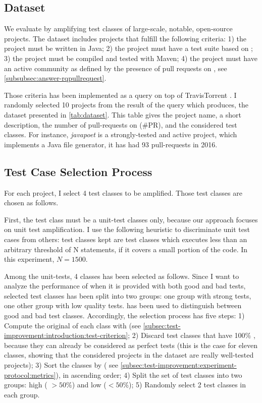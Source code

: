 \subsection{Dataset}
\label{subsec:test-improvement:experiment-protocol:dataset}

We evaluate \dspot by amplifying test classes of large-scale, notable, open-source projects. The dataset includes projects that fulfill the following criteria:  
1) the project must be written in Java; 
2) the project must have a test suite based on \junit;
3) the project must be compiled and tested with Maven;
4) the project must have an active community as defined by the presence of pull requests on \gh, see \autoref{subsubsec:answer-rqpullrequest}. 



Those criteria has been implemented as a query on top of TravisTorrent \cite{msr17challenge}. 
I randomly selected 10 projects from the result of the query which produces, the dataset presented in \autoref{tab:dataset}.
This table gives the project name, a short description, the number of pull-requests on \gh (\#PR), and the considered test classes.
For instance, \emph{javapoet} is a strongly-tested and active project, which implements a Java file generator, it has had 93 pull-requests in 2016.


\subsection{Test Case Selection Process}
\label{subsec:test-improvement:experiment-protocol:test-preparation}

For each project, I select 4 test classes to be amplified. 
Those test classes are chosen as follows.

First, the test class must be a unit-test classes only, because our approach focuses on unit test amplification. 
I use the following heuristic to discriminate unit test cases from others: test classes kept are test classes which executes less than an arbitrary threshold of N statements, \ie if it covers a small portion of the code. 
In this experiment, $N=1500$.

Among the unit-tests, 4 classes has been selected as follows.
Since I want to analyze the performance of \dspot when it is provided with both good and bad tests, selected test classes has been split into two groups: 
one group with strong tests, one other group with low quality tests.
\ms has been used to distinguish between good and bad test classes.
Accordingly, the selection process has five steps: 
1) Compute the original \ms of each class with \pitest (see \autoref{subsec:test-improvement:introduction:test-criterion};
2) Discard test classes that have 100\% \ms, because they can already be considered as perfect tests 
(this is the case for eleven classes, showing that the considered projects in the dataset are really well-tested projects);
3) Sort the classes by \ms ( see \autoref{subsec:test-improvement:experiment-protocol:metrics}), in ascending order;
4) Split the set of test classes into two groups: high \ms( $> 50\%$) and low \ms  ($< 50\%$);
5) Randomly select 2 test classes in each group.

